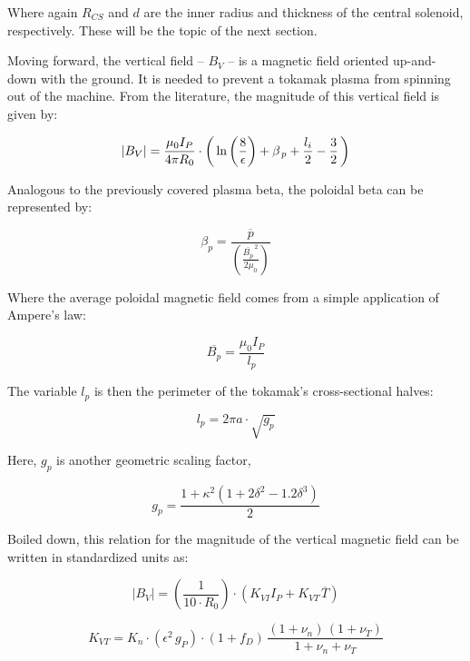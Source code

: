 Where again $R_{CS}$ and $d$ are the inner radius and thickness of the central solenoid, respectively. These will be the topic of the next section.

Moving forward, the vertical field -- $B_V$ -- is a magnetic field oriented up-and-down with the ground. It is needed to prevent a tokamak plasma from spinning out of the machine. From the literature, the magnitude of this vertical field  is given by: \cite{process}

\begin{equation}
  |B_V| = \frac{\mu_0 I_P}{4 \pi R_0} \cdot \left( \,\textnormal{ln} \left(\frac{8}{\epsilon}\right) + \beta_{\,p} + \frac{l_i}{2} - \frac{3}{2} \, \right)
\end{equation} 

Analogous to the previously covered plasma beta, the poloidal beta can be represented by: \cite{elongation}

\begin{equation}
  \beta_p = \frac{\overline{p}}{\left( \frac{\overline{B_p}^{\,2}}{2 \mu_0} \right)}
\end{equation}

Where the average poloidal magnetic field comes from a simple application of Ampere's law:

\begin{equation}
	\overline{B_p} = \frac{\mu_0 I_P}{l_p}
\end{equation}

The variable $l_p$ is then the perimeter of the tokamak's cross-sectional halves:

\begin{equation}
	l_p = 2 \pi a \cdot \sqrt{g_p}
\end{equation}

Here, $g_p$ is another geometric scaling factor,

\begin{equation}
  g_p = \frac{1 + \kappa^2 ( 1 + 2 \delta^2 - 1.2\delta^3 )}{2} 
\end{equation}

Boiled down, this relation for the magnitude of the vertical magnetic field can be written in standardized units as:

\begin{equation}
	|B_V| = \left( \frac{ 1 }{ 10 \cdot R_0} \right) \cdot \left( K_{VI} I_P +  K_{VT\,} \overline{T}  \right)
\end{equation}

\begin{equation}
	K_{VT} = K_{n} \cdot ( \epsilon ^ 2 \, g_P ) \cdot ( 1 + f_D ) \, \frac{ (1 + \nu_n) \, (1 + \nu_T) }{1 + \nu_n + \nu_T }
\end{equation}

